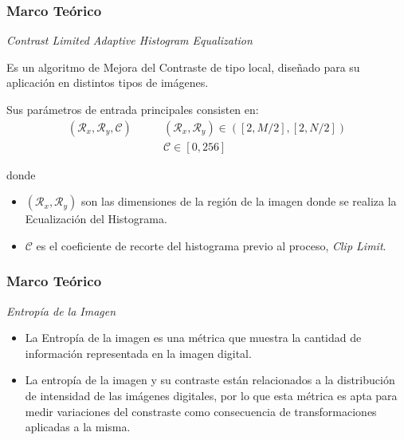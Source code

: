 \documentclass[usenames,dvipsnames]{beamer}
\begin{document}
\begin{frame} 
\frametitle{Marco Teórico} 
\begin{exampleblock}{\textit{Contrast Limited Adaptive Histogram Equalization}}

Es un algoritmo de Mejora del Contraste de tipo local, diseñado para su aplicación en distintos tipos de imágenes. 

Sus parámetros de entrada principales consisten en:
\begin{equation}
\begin{split}
(\mathscr{R}_x, \mathscr{R}_y, \mathscr{C}) & \qquad (\mathscr{R}_x, \mathscr{R}_y) \in ([2,M/2],[2,N/2]) \\
											& \qquad \mathscr{C} \in [0,256]
\end{split}
\end{equation}


donde
\end{exampleblock}
\centering

\begin{itemize}
	\item $(\mathscr{R}_x, \mathscr{R}_y)$ son las dimensiones de la región de la imagen donde se realiza la Ecualización del Histograma.
	\item $\mathscr{C}$ es el coeficiente de recorte del histograma previo al proceso, \textit{Clip Limit}. 
\end{itemize}


\end{frame}

\begin{frame} 
\frametitle{Marco Teórico} 
\begin{exampleblock}{\textit{Entropía de la Imagen}}
\begin{itemize}

\item La Entropía de la imagen es una métrica que muestra la cantidad de información representada en la imagen digital.

\item La entropía de la imagen y su contraste están relacionados a la distribución de intensidad de las imágenes digitales, por lo que esta métrica es apta para medir variaciones del constraste como consecuencia de transformaciones aplicadas a la misma.

\end{itemize}

\end{exampleblock}

\centering

\end{frame}
\end{document}
